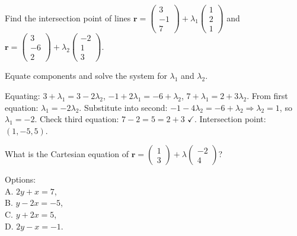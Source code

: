 \begin{problem}
Find the intersection point of lines $\mathbf{r} = \begin{pmatrix} 3 \\ -1 \\ 7 \end{pmatrix} + \lambda_1 \begin{pmatrix} 1 \\ 2 \\ 1 \end{pmatrix}$ and $\mathbf{r} = \begin{pmatrix} 3 \\ -6 \\ 2 \end{pmatrix} + \lambda_2 \begin{pmatrix} -2 \\ 1 \\ 3 \end{pmatrix}$.
\end{problem}

\begin{hint}
Equate components and solve the system for $\lambda_1$ and $\lambda_2$.
\end{hint}

\begin{solution}[Sketch]
Equating: $3 + \lambda_1 = 3 - 2\lambda_2$, $-1 + 2\lambda_1 = -6 + \lambda_2$, $7 + \lambda_1 = 2 + 3\lambda_2$. From first equation: $\lambda_1 = -2\lambda_2$. Substitute into second: $-1 - 4\lambda_2 = -6 + \lambda_2 \Rightarrow \lambda_2 = 1$, so $\lambda_1 = -2$. Check third equation: $7 - 2 = 5 = 2 + 3$ $\checkmark$. Intersection point: $(1, -5, 5)$.
\end{solution}

\vspace{1em}

\begin{problem}
What is the Cartesian equation of $\mathbf{r} = \begin{pmatrix} 1 \\ 3 \end{pmatrix} + \lambda \begin{pmatrix} -2 \\ 4 \end{pmatrix}$? 

Options: \\
A. $2y + x = 7$, \\
B. $y - 2x = -5$, \\
C. $y + 2x = 5$, \\ 
D. $2y - x = -1$.
\end{problem}

